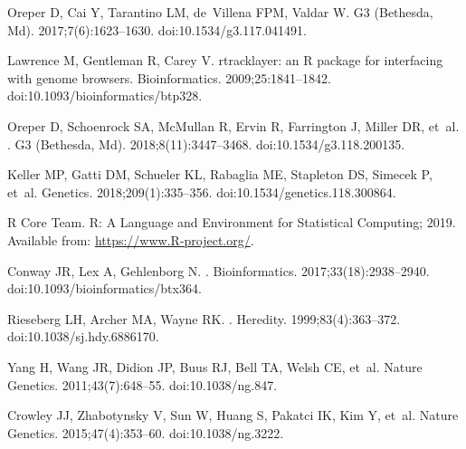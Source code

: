 \documentclass[10pt,letterpaper]{article}
\begin{document}
\begin{thebibliography}{10}
Oreper D, Cai Y, Tarantino LM, de~Villena FPM, Valdar W.
\newblock G3 (Bethesda, Md). 2017;7(6):1623--1630.
\newblock doi:{10.1534/g3.117.041491}.

Lawrence M, Gentleman R, Carey V.
\newblock rtracklayer: an R package for interfacing with genome browsers.
\newblock Bioinformatics. 2009;25:1841--1842.
\newblock doi:{10.1093/bioinformatics/btp328}.

Oreper D, Schoenrock SA, McMullan R, Ervin R, Farrington J, Miller DR, et~al.
.
\newblock G3 (Bethesda, Md). 2018;8(11):3447--3468.
\newblock doi:{10.1534/g3.118.200135}.

Keller MP, Gatti DM, Schueler KL, Rabaglia ME, Stapleton DS, Simecek P, et~al.
\newblock Genetics. 2018;209(1):335--356.
\newblock doi:{10.1534/genetics.118.300864}.

{R Core Team}. R: A Language and Environment for Statistical Computing; 2019.
\newblock Available from: \url{https://www.R-project.org/}.

Conway JR, Lex A, Gehlenborg N.
.
\newblock Bioinformatics. 2017;33(18):2938--2940.
\newblock doi:{10.1093/bioinformatics/btx364}.

Rieseberg LH, Archer MA, Wayne RK.
.
\newblock Heredity. 1999;83(4):363--372.
\newblock doi:{10.1038/sj.hdy.6886170}.

Yang H, Wang JR, Didion JP, Buus RJ, Bell TA, Welsh CE, et~al.
\newblock Nature Genetics. 2011;43(7):648--55.
\newblock doi:{10.1038/ng.847}.

Crowley JJ, Zhabotynsky V, Sun W, Huang S, Pakatci IK, Kim Y, et~al.
\newblock Nature Genetics. 2015;47(4):353--60.
\newblock doi:{10.1038/ng.3222}.


\end{thebibliography}
\end{document}
